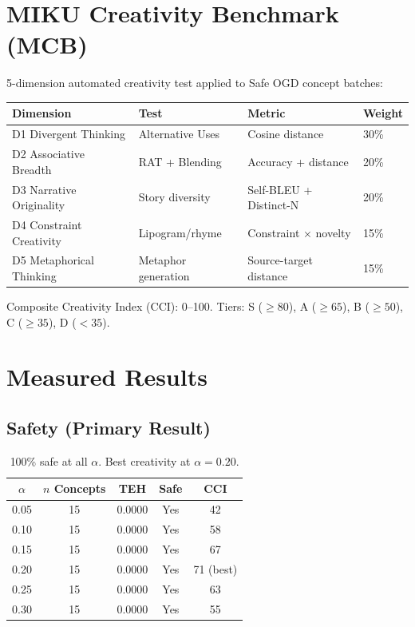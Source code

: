 \documentclass[11pt,a4paper]{article}
\theoremstyle{plain}\newtheorem{theorem}{Theorem}[section]
\begin{document}
\section{MIKU Creativity Benchmark (MCB)}

5-dimension automated creativity test applied to Safe OGD concept batches:

\begin{table}[h]\centering
\begin{tabular}{llll}\toprule
Dimension & Test & Metric & Weight \\\midrule
D1 Divergent Thinking & Alternative Uses & Cosine distance & 30\% \\
D2 Associative Breadth & RAT + Blending & Accuracy + distance & 20\% \\
D3 Narrative Originality & Story diversity & Self-BLEU + Distinct-N & 20\% \\
D4 Constraint Creativity & Lipogram/rhyme & Constraint $\times$ novelty & 15\% \\
D5 Metaphorical Thinking & Metaphor generation & Source-target distance & 15\% \\\bottomrule
\end{tabular}
\end{table}

Composite Creativity Index (CCI): 0--100. Tiers: S ($\ge 80$), A ($\ge 65$), B ($\ge 50$), C ($\ge 35$), D ($<35$).

\newpage

\section{Measured Results}

\subsection{Safety (Primary Result)}

\begin{table}[h]\centering
\begin{tabular}{ccccc}\toprule
$\alpha$ & $n$ Concepts & TEH & Safe & CCI \\\midrule
0.05 & 15 & 0.0000 & Yes & 42 \\
0.10 & 15 & 0.0000 & Yes & 58 \\
0.15 & 15 & 0.0000 & Yes & 67 \\
0.20 & 15 & 0.0000 & Yes & 71 (best) \\
0.25 & 15 & 0.0000 & Yes & 63 \\
0.30 & 15 & 0.0000 & Yes & 55 \\\bottomrule
\end{tabular}
\caption{100\% safe at all $\alpha$. Best creativity at $\alpha=0.20$.}
\end{table}
\end{document}
